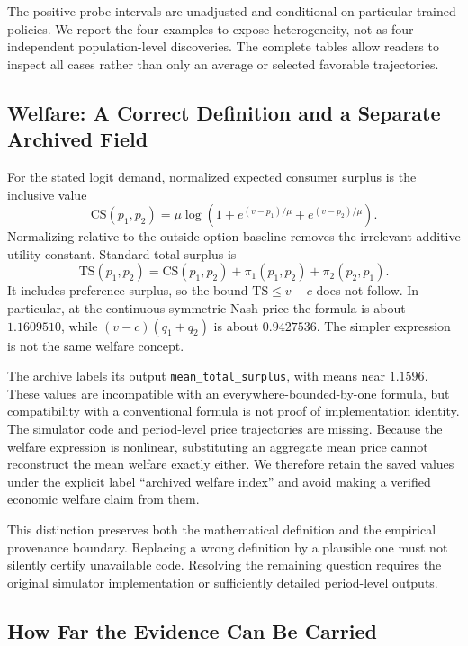 \documentclass{article}
\begin{document}
The positive-probe intervals are unadjusted and conditional on particular trained policies. We report the four examples to expose heterogeneity, not as four independent population-level discoveries. The complete tables allow readers to inspect all cases rather than only an average or selected favorable trajectories.

\subsection{Welfare: A Correct Definition and a Separate Archived Field}\label{app:welfare}

For the stated logit demand, normalized expected consumer surplus is the inclusive value
\[
\mathrm{CS}(p_1,p_2)=\mu\log\!\left(1+e^{(v-p_1)/\mu}+e^{(v-p_2)/\mu}\right).
\]
Normalizing relative to the outside-option baseline removes the irrelevant additive utility constant. Standard total surplus is
\begin{equation}
\mathrm{TS}(p_1,p_2)=\mathrm{CS}(p_1,p_2)
+\pi_1(p_1,p_2)+\pi_2(p_2,p_1).
\label{eq:supp-welfare}
\end{equation}
It includes preference surplus, so the bound $\mathrm{TS}\le v-c$ does not follow. In particular, at the continuous symmetric Nash price the formula is about $1.1609510$, while $(v-c)(q_1+q_2)$ is about $0.9427536$. The simpler expression is not the same welfare concept.

The archive labels its output \texttt{mean\_total\_surplus}, with means near $1.1596$. These values are incompatible with an everywhere-bounded-by-one formula, but compatibility with a conventional formula is not proof of implementation identity. The simulator code and period-level price trajectories are missing. Because the welfare expression is nonlinear, substituting an aggregate mean price cannot reconstruct the mean welfare exactly either. We therefore retain the saved values under the explicit label ``archived welfare index'' and avoid making a verified economic welfare claim from them.

This distinction preserves both the mathematical definition and the empirical provenance boundary. Replacing a wrong definition by a plausible one must not silently certify unavailable code. Resolving the remaining question requires the original simulator implementation or sufficiently detailed period-level outputs.

\subsection{How Far the Evidence Can Be Carried}
\end{document}
